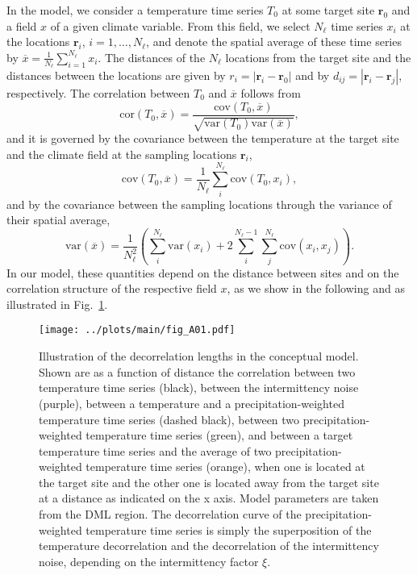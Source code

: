\documentclass[cp, manuscript]{copernicus}
\begin{document}
In the model, we consider a temperature time series $T_0$ at some target site
$\mathbf{r}_0$ and a field $x$ of a given climate variable. From this field, we
select $N_{\ell}$ time series $x_i$ at the locations $\mathbf{r}_i$,
$i=1,\dotsc,N_{\ell}$, and denote the spatial average of these time series by
$\overline{x}=\frac{1}{N_{\ell}}\sum_{i=1}^{N_{\ell}}{x_i}$. The distances of
the $N_{\ell}$ locations from the target site and the distances between the
locations are given by $r_i=|\mathbf{r}_i-\mathbf{r}_0|$ and by
$d_{ij}=|{\mathbf{r}_i-\mathbf{r}_j}|$, respectively. The correlation between
$T_0$ and $\overline{x}$ follows from
%
\begin{equation}
\label{eq:corr.general}
\mathrm{cor}(T_0,\overline{x})=\frac
{\mathrm{cov}(T_0,\overline{x})}
{\sqrt{\mathrm{var}(T_0)\mathrm{var}(\overline{x})}},
\end{equation}
%
and it is governed by the covariance between the temperature at the target site
and the climate field at the sampling locations $\mathbf{r}_i$,
%
\begin{equation}
\label{eq:cov.general}
\mathrm{cov}(T_0,\overline{x})=
\frac{1}{N_{\ell}}\sum_{i}^{N_{\ell}}{\mathrm{cov}(T_0,x_i)},
\end{equation}
%
and by the covariance between the sampling locations through the variance of
their spatial average,
\begin{equation}
\label{eq:var.general}
\mathrm{var}(\overline{x})=
\frac{1}{N_{\ell}^2}\left(
\sum_{i}^{N_{\ell}}{\mathrm{var}(x_i)} +
2\sum_{i}^{N_{\ell}-1}\sum_{j}^{N_{\ell}}{\mathrm{cov}(x_i,x_j)}
\right).
\end{equation}
%
In our model, these quantities depend on the distance between sites and on the
correlation structure of the respective field $x$, as we show in the following
and as illustrated in Fig.~\ref{fig:conceptual.model.illustration}.

\begin{figure}[t]%
\centering
\texttt{[image: ../plots/main/fig\_A01.pdf]}
\caption{%
  Illustration of the decorrelation lengths in the conceptual model. Shown are
  as a function of distance the correlation between two temperature time series
  (black), between the intermittency noise (purple), between a temperature and a
  precipitation-weighted temperature time series (dashed black), between two
  precipitation-weighted temperature time series (green), and between a target
  temperature time series and the average of two precipitation-weighted
  temperature time series (orange), when one is located at the target site and
  the other one is located away from the target site at a distance as indicated
  on the x axis. Model parameters are taken from the DML region. The
  decorrelation curve of the precipitation-weighted temperature time series is
  simply the superposition of the temperature decorrelation and the
  decorrelation of the intermittency noise, depending on the intermittency
  factor $\xi$.}
\label{fig:conceptual.model.illustration}%
\end{figure}%
\end{document}
